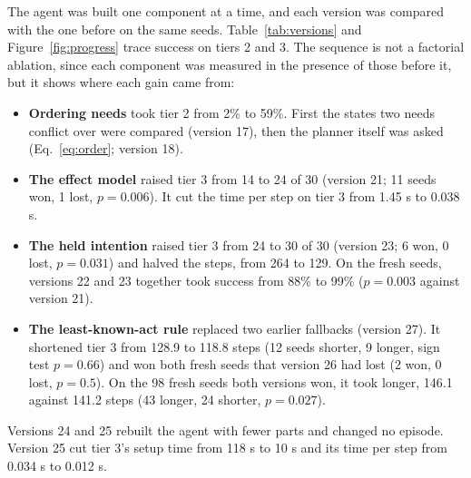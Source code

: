 \documentclass{article}
\begin{document}
The agent was built one component at a time, and each version was compared with the one before on the same seeds. Table~\ref{tab:versions} and Figure~\ref{fig:progress} trace success on tiers 2 and 3. The sequence is not a factorial ablation, since each component was measured in the presence of those before it, but it shows where each gain came from:
\begin{itemize}
    \item \textbf{Ordering needs} took tier 2 from 2\% to 59\%. First the states two needs conflict over were compared (version 17), then the planner itself was asked (Eq.~\eqref{eq:order}; version 18).
    \item \textbf{The effect model} raised tier 3 from 14 to 24 of 30 (version 21; 11 seeds won, 1 lost, $p=0.006$). It cut the time per step on tier 3 from 1.45 s to 0.038 s.
    \item \textbf{The held intention} raised tier 3 from 24 to 30 of 30 (version 23; 6 won, 0 lost, $p=0.031$) and halved the steps, from 264 to 129. On the fresh seeds, versions 22 and 23 together took success from 88\% to 99\% ($p=0.003$ against version 21).
    \item \textbf{The least-known-act rule} replaced two earlier fallbacks (version 27). It shortened tier 3 from 128.9 to 118.8 steps (12 seeds shorter, 9 longer, sign test $p=0.66$) and won both fresh seeds that version 26 had lost (2 won, 0 lost, $p=0.5$). On the 98 fresh seeds both versions won, it took longer, 146.1 against 141.2 steps (43 longer, 24 shorter, $p=0.027$).
\end{itemize}
Versions 24 and 25 rebuilt the agent with fewer parts and changed no episode. Version 25 cut tier 3's setup time from 118 s to 10 s and its time per step from 0.034 s to 0.012 s.
\end{document}
